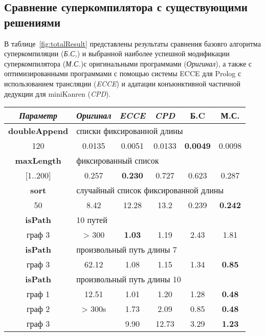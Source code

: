 \subsection{Сравнение суперкомпилятора с существующими решениями}

В таблице~\ref{fig:totalResult} представлены результаты сравнения базовго алгоритма
суперкомпиляции ({\it Б.С,}) и выбранной наиболее успешной модификации
суперкомпилятора ({\it М.С.})с оригинальными программами ({\it Оригинал}),
а также с оптимизированными программами с помощью
системы ECCE для Prolog с использованием трансляции ({\it ECCE}) и адатации
конъюнктивной частичной дедукции для miniKanren ({\it CPD}).

\begin{table}[h!]
\center
\begin{tabular}{|c|c|c|c|c|c|}
\hline
{\it Параметр} & {\it Оригинал} & {\it ECCE }  & {\it CPD} & {\bf Б.C} & {\bf М.С.} \\ \hline
{\bf doubleAppend} & \multicolumn{5}{|l|}{списки фиксированной длины } \\ \hline
120                & 0.0135 & 0.0051 & 0.0133 & {\bf 0.0049} & 0.0098 \\ \hline


{\bf maxLength} & \multicolumn{5}{|l|}{фиксированный список} \\ \hline

       [1..200] & 0.257 & {\bf 0.230} & 0.727 & 0.623 & 0.287 \\ \hline


{\bf sort} & \multicolumn{5}{|l|}{случайный список фиксированной длины } \\ \hline
50       & 8.42     & 12.28 & 13.2 & 0.239  & {\bf 0.242} \\ \hline

 {\bf isPath} & \multicolumn{5}{|l|}{10 путей} \\ \hline
  граф 3      & > 300 & {\bf 1.03} & 1.19 & 2.43 & 1.81 \\ \hline

 {\bf isPath} & \multicolumn{5}{|l|}{произвольный путь длины 7} \\ \hline
   граф 3     & 62.12 & 1.08 & 1.15 & 1.34 & {\bf 0.85} \\ \hline
 {\bf isPath} & \multicolumn{5}{|l|}{произвольный путь длины 10} \\ \hline
 граф 1  &  12.51  & 1.01 & 1.20 &  1.28 & {\bf 0.48} \\
 граф 2  &  > 300s & 1.73 & 2.09 & 0.85 & {\bf 0.48} \\ 
 граф 3  &         & 9.90 & 12.73& 3.29 & {\bf 1.23} \\
 \hline


\end{tabular}
\end{table}
